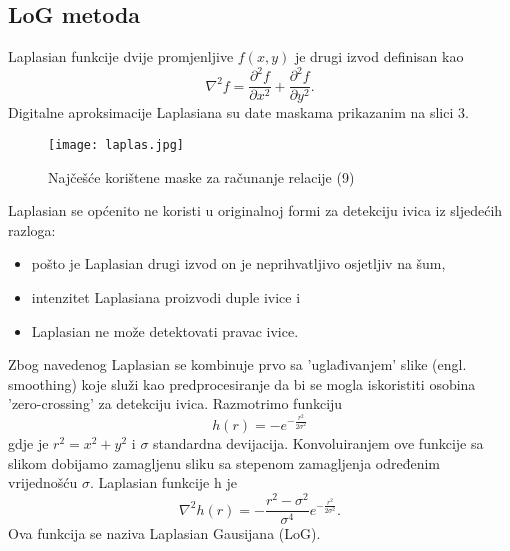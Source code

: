 ﻿\documentclass[conference]{IEEEtran}
\begin{document}
 \subsection{LoG metoda}
 Laplasian funkcije dvije promjenljive $f(x,y)$ je drugi izvod definisan kao 
\begin{equation}
    \nabla ^2 f = \frac{\partial ^2 f}{\partial x^2} + \frac{\partial ^2 f}{\partial y^2}.
\end{equation}
Digitalne aproksimacije Laplasiana su date maskama prikazanim na slici 3.
\begin{figure}[htbp]
\centerline{
\texttt{[image: laplas.jpg]}
}
\caption{Najčešće korištene maske za računanje relacije (9)}
\label{fig}
\end{figure}
Laplasian se općenito ne koristi u originalnoj formi za detekciju ivica iz sljedećih razloga:
\begin{itemize}
    \item pošto je Laplasian drugi izvod on je neprihvatljivo osjetljiv na šum,
    \item intenzitet Laplasiana proizvodi duple ivice i
    \item Laplasian ne može detektovati pravac ivice.
\end{itemize}
Zbog navedenog Laplasian se kombinuje prvo sa 'uglađivanjem' slike (engl. smoothing) koje služi kao predprocesiranje da bi se mogla iskoristiti osobina 'zero-crossing' za detekciju ivica. Razmotrimo funkciju
\begin{equation}
    h(r) = -e^{-\frac{r^2}{2\sigma^2}} 
\end{equation}
gdje je $r^2 = x^2 + y^2$ i  $\sigma$ standardna devijacija. Konvoluiranjem ove funkcije sa slikom dobijamo zamagljenu sliku sa stepenom zamagljenja određenim vrijednošću $\sigma$. Laplasian funkcije h je
\begin{equation}
\nabla ^2 h(r) = -\frac{r^2 - \sigma ^2}{\sigma^4}e^{-\frac{r^2}{2\sigma^2}}.
\end{equation}
Ova funkcija se naziva Laplasian Gausijana (LoG). 
\end{document}
